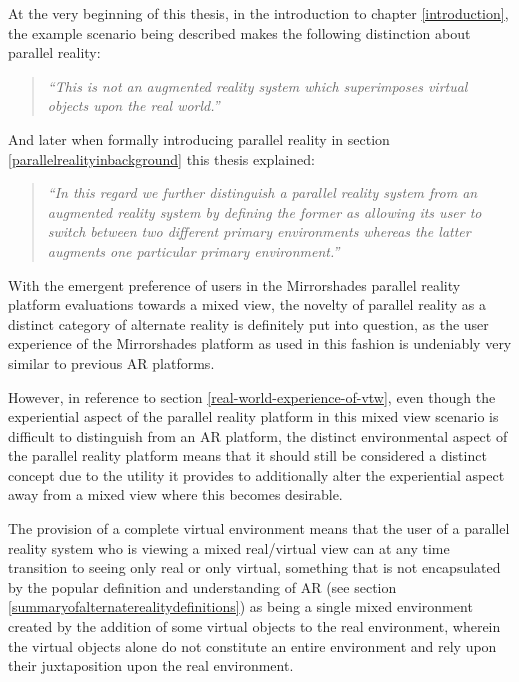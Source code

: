 At the very beginning of this thesis, in the introduction to chapter \ref{introduction}, the example scenario being described makes the following distinction about parallel reality:

\begin{quote}
	\textit{``This is not an augmented reality system which superimposes virtual objects upon the real world.''}
\end{quote}

And later when formally introducing parallel reality in section \ref{parallelrealityinbackground} this thesis explained:

\begin{quote}
	\textit{``In this regard we further distinguish a parallel reality system from an augmented reality system by defining the former as allowing its user to switch between two different primary environments whereas the latter augments one particular primary environment.''}
\end{quote}

With the emergent preference of users in the Mirrorshades parallel reality platform evaluations towards a mixed view, the novelty of parallel reality as a distinct category of alternate reality is definitely put into question, as the user experience of the Mirrorshades platform as used in this fashion is undeniably very similar to previous AR platforms.

However, in reference to section \ref{real-world-experience-of-vtw}, even though the experiential aspect of the parallel reality platform in this mixed view scenario is difficult to distinguish from an AR platform, the distinct environmental aspect of the parallel reality platform means that it should still be considered a distinct concept due to the utility it provides to additionally alter the experiential aspect away from a mixed view where this becomes desirable.

The provision of a complete virtual environment means that the user of a parallel reality system who is viewing a mixed real/virtual view can at any time transition to seeing only real or only virtual, something that is not encapsulated by the popular definition and understanding of AR (see section \ref{summaryofalternaterealitydefinitions}) as being a single mixed environment created by the addition of some virtual objects to the real environment, wherein the virtual objects alone do not constitute an entire environment and rely upon their juxtaposition upon the real environment.

